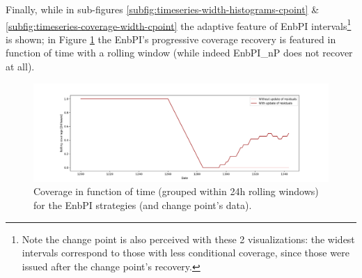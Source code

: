 Finally, while in sub-figures \ref{subfig:timeseries-width-histograms-cpoint} \& \ref{subfig:timeseries-coverage-width-cpoint} the adaptive feature of EnbPI intervals\footnote{Note the change point is also perceived with these 2 visualizations: the widest intervals correspond to those with less conditional coverage, since those were issued after the change point's recovery.} is shown; in Figure \ref{fig:timeseries-rolling-coverage-cpoint} the EnbPI's progressive coverage recovery is featured in function of time with a rolling window (while indeed EnbPI\_{}nP does not recover at all).

\begin{figure}[ht]
    \centering
    \includegraphics[width=\textwidth]{Figures/timeseries/with-change-point/rolling-coverage-with-change-point.png}
    \caption{Coverage in function of time (grouped within 24h rolling windows) for the EnbPI strategies (and change point's data).}
    \label{fig:timeseries-rolling-coverage-cpoint}
\end{figure}